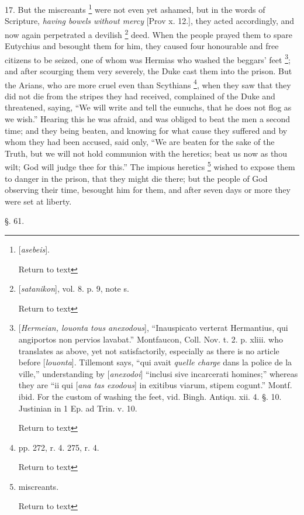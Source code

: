 17. But the miscreants \footnote{[\emph{asebeis}].

Return to text} were not even
yet ashamed, but in the words of Scripture, \emph{having bowels without
mercy} [Prov x. 12.], they acted accordingly, and now again
perpetrated a devilish \footnote{[\emph{satanikon}], vol. 8. p. 9, note s.

Return to text} deed. When the people prayed them to
spare Eutychius and besought them for him, they caused four honourable
and free citizens to be seized, one of whom was Hermias who washed the
beggars' feet \footnote{[\emph{Hermeian, louonta tous anexodous}],
``Inauspicato verterat Hermantius, qui angiportos non pervios lavabat.''
Montfaucon, Coll. Nov. t. 2. p. xliii. who translates as above, yet
not satisfactorily, especially as there is no article before [\emph{louonta}].
Tillemont says, ``qui avait \emph{quelle charge} dans la police de la
ville,'' understanding by [\emph{anexodoi}] ``inclusi sive
incarcerati homines;'' whereas they are ``ii qui [\emph{ana tas exodous}]
in exitibus viarum, stipem cogunt.'' Montf. ibid. For the custom of
washing the feet, vid. Bingh. Antiqu. xii. 4. §. 10. Justinian in 1
Ep. ad Trin. v. 10.

Return to text}; and after scourging them very severely, the
Duke cast them into the prison. But the Arians, who are more cruel
even than Scythians \footnote{pp. 272, r. 4. 275, r. 4.

Return to text}, when they saw that they did not die
from the stripes they had received, complained of the Duke and
threatened, saying, ``We will write and tell the eunuchs, that he
does not flog as we wish.'' Hearing this he was afraid, and was
obliged to beat the men a second time; and they being beaten, and
knowing for what cause they suffered and by whom they had been
accused, said only, ``We are beaten for the sake of the Truth, but we
will not hold communion with the heretics; beat us now as thou wilt;
God will judge thee for this.'' The impious heretics \footnote{miscreants.

Return to text} wished
to expose them to danger in the prison, that they might die there; but
the people of God observing their time, besought him for them, and
after seven days or more they were set at liberty.

§. 61.


